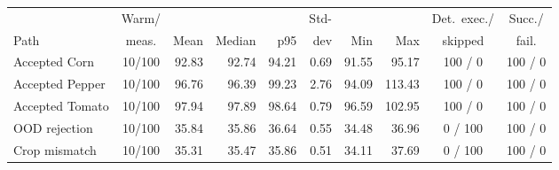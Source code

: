 \begin{center}
\scriptsize
\setlength{\tabcolsep}{3pt}
\begin{tabular}{l c r r r r r r c c}
\toprule
      & Warm/ &      &        &     & Std- &     &     & Det.\ exec./ & Succ./ \\
Path  & meas. & Mean & Median & p95 & dev  & Min & Max & skipped      & fail.  \\
\midrule
Accepted Corn       & 10/100 & 92.83  & 92.74  & 94.21  & 0.69 & 91.55  & 95.17  & 100 / 0 & 100 / 0 \\
Accepted Pepper     & 10/100 & 96.76  & 96.39  & 99.23  & 2.76 & 94.09  & 113.43 & 100 / 0 & 100 / 0 \\
Accepted Tomato     & 10/100 & 97.94  & 97.89  & 98.64  & 0.79 & 96.59  & 102.95 & 100 / 0 & 100 / 0 \\
OOD rejection       & 10/100 & 35.84  & 35.86  & 36.64  & 0.55 & 34.48  & 36.96  & 0 / 100 & 100 / 0 \\
Crop mismatch       & 10/100 & 35.31  & 35.47  & 35.86  & 0.51 & 34.11  & 37.69  & 0 / 100 & 100 / 0 \\
\bottomrule
\end{tabular}
\end{center}

